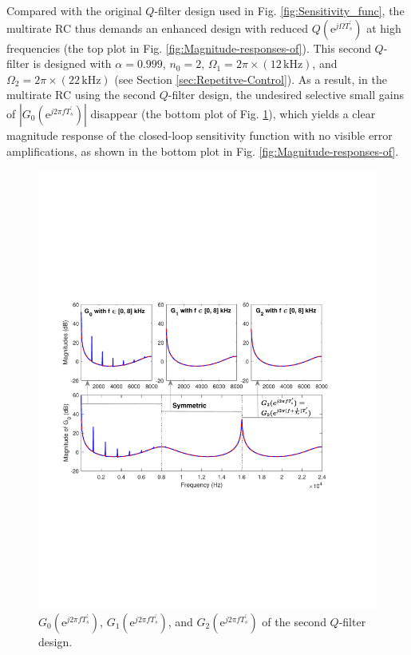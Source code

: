 \documentclass [11pt, proquest] {uwthesis}[2020/02/24]
\begin{document}
Compared with the original $Q$-filter design used in Fig. \ref{fig:Sensitivity_func},
the multirate RC thus demands an enhanced design with reduced $Q(\text{e}^{j\Omega T_{s}^{'}})$
at high frequencies (the top plot in Fig. \ref{fig:Magnitude-responses-of}).
This second $Q$-filter is designed with $\alpha=0.999$, $n_{0}=2$,
$\Omega_{1}=2\pi\times(12\,\text{kHz})$, and $\Omega_{2}=2\pi\times(22\,\text{kHz})$
(see Section \ref{sec:Repetitve-Control}). As a result, in the multirate
RC using the second $Q$-filter design, the undesired selective small
gains of $|G_{0}(\text{e}^{j2\pi fT_{s}^{'}})|$ disappear (the bottom
plot of Fig. \ref{fig:The-relationship-between-2}), which yields
a clear magnitude response of the closed-loop sensitivity function
with no visible error amplifications, as shown in the bottom plot
in Fig. \ref{fig:Magnitude-responses-of}.
\begin{figure}[!ht]
\begin{centering}
\includegraphics[width=15cm]{Fractional-order-RC/G_all_another_Q}
\par\end{centering}
\caption{\label{fig:The-relationship-between-2}$G_{0}(\text{e}^{j2\pi fT_{s}^{'}})$,
$G_{1}(\text{e}^{j2\pi fT_{s}^{'}})$, and $G_{2}(\text{e}^{j2\pi fT_{s}^{'}})$
of the second $Q$-filter design.}
\end{figure}
\end{document}
